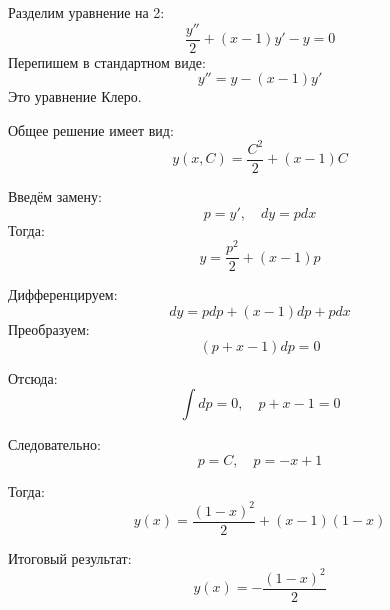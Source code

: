 \begin{solution}
    Разделим уравнение на 2:
    $$ \frac{y''}{2} + (x - 1)y' - y = 0 $$
    Перепишем в стандартном виде:
    $$ y'' = y - (x - 1)y' $$
    Это уравнение Клеро.

    Общее решение имеет вид:
    $$ y(x, C) = \frac{C^2}{2} + (x - 1)C $$

    Введём замену:
    $$ p = y', \quad dy = p dx $$
    Тогда:
    $$ y = \frac{p^2}{2} + (x - 1)p $$

    Дифференцируем:
    $$ dy = p dp + (x - 1) dp + p dx $$
    Преобразуем:
    $$ (p + x - 1) dp = 0 $$

    Отсюда:
    $$ \int dp = 0, \quad p + x - 1 = 0 $$

    Следовательно:
    $$ p = C, \quad p = -x + 1 $$

    Тогда:
    $$ y(x) = \frac{(1 - x)^2}{2} + (x - 1)(1 - x) $$

    Итоговый результат:
    $$ y(x) = -\frac{(1 - x)^2}{2} $$
\end{solution}\pagebreak

\pagebreak